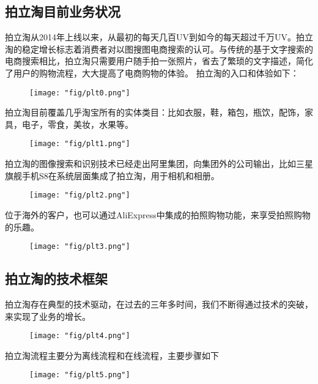 \subsection{拍立淘目前业务状况}
拍立淘从2014年上线以来，从最初的每天几百UV到如今的每天超过千万UV。拍立淘的稳定增长标志着消费者对以图搜图电商搜索的认可。与传统的基于文字搜索的电商搜索相比，拍立淘只需要用户随手拍一张照片，省去了繁琐的文字描述，简化了用户的购物流程，大大提高了电商购物的体验。
拍立淘的入口和体验如下：

\begin{figure}[!h]
	\centering
	\texttt{[image: "fig/plt0.png"]}
	\caption{}
	\label{fig:plt0}
\end{figure}

拍立淘目前覆盖几乎淘宝所有的实体类目：比如衣服，鞋，箱包，瓶饮，配饰，家具，电子，零食，美妆，水果等。

\begin{figure}[!h]
	\centering
	\texttt{[image: "fig/plt1.png"]}
	\caption{}
	\label{fig:plt1}
\end{figure}

拍立淘的图像搜索和识别技术已经走出阿里集团，向集团外的公司输出，比如三星旗舰手机S8在系统层面集成了拍立淘，用于相机和相册。
\begin{figure}[!h]
	\centering
	\texttt{[image: "fig/plt2.png"]}
	\caption{}
	\label{fig:plt2}
\end{figure}
位于海外的客户，也可以通过AliExpress中集成的拍照购物功能，来享受拍照购物的乐趣。
\begin{figure}[!h]
	\centering
	\texttt{[image: "fig/plt3.png"]}
	\caption{}
	\label{fig:plt3}
\end{figure}
\subsection{拍立淘的技术框架}
拍立淘存在典型的技术驱动，在过去的三年多时间，我们不断得通过技术的突破，来实现了业务的增长。
\begin{figure}[!h]
	\centering
	\texttt{[image: "fig/plt4.png"]}
	\caption{}
	\label{fig:plt4}
\end{figure}
拍立淘流程主要分为离线流程和在线流程，主要步骤如下

\begin{figure}[!h]
	\centering
	\texttt{[image: "fig/plt5.png"]}
	\caption{}
	\label{fig:plt5}
\end{figure}

